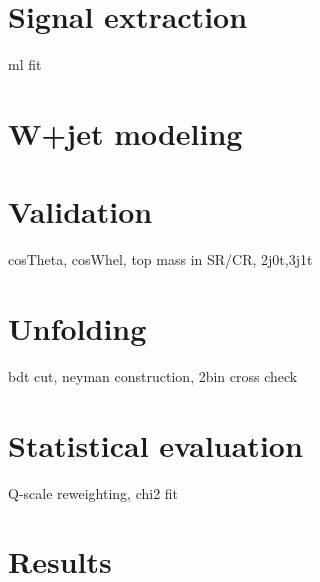 
\section{Signal extraction}

ml fit

\section{W+jet modeling}

\section{Validation}

cosTheta, cosWhel, top mass in SR/CR, 2j0t,3j1t

\section{Unfolding}

bdt cut, neyman construction, 2bin cross check

\section{Statistical evaluation}

Q-scale reweighting, chi2 fit

\section{Results}

